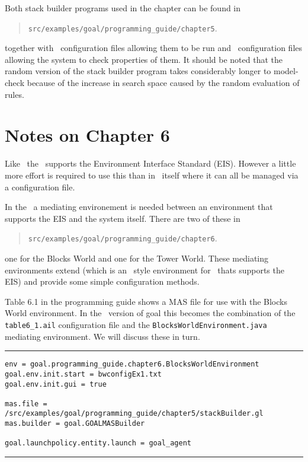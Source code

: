 \documentclass[a4]{article}
\begin{document}
{{{{Both stack builder programs used in the chapter can be found in
\begin{quote}
  \texttt{src/examples/goal/programming\_guide/chapter5}.
\end{quote}
together with \ail\ configuration files allowing them to be run and \ajpf\ configuration files allowing the system to check properties of them.  It should be noted that the random version of the stack builder program takes considerably longer to model-check because of the increase in search space caused by the random evaluation of rules.

\section{Notes on Chapter 6}

Like \goal\ the \ail\ supports the Environment Interface Standard (EIS).  However a little more effort is required to use this than in \goal\ itself where it can all be managed via a configuration file.

In the \ail\ a mediating environement is needed between an environment that supports the EIS and the system itself.  There are two of these in 
\begin{quote}
  \texttt{src/examples/goal/programming\_guide/chapter6}.
\end{quote}
one for the Blocks World and one for the Tower World.  These mediating environments extend  (which is an \ail\ style environment for \goal\ thats supports the EIS) and provide some simple configuration methods.

Table 6.1 in the programming guide shows a MAS file for use with the Blocks World environment.  In the \ail\ version of goal this becomes the combination of the \texttt{table6\_1.ail} configuration file and the \texttt{BlocksWorldEnvironment.java} mediating environment.  We will discuss these in turn.

\noindent\rule{\textwidth}{1pt}
\begin{small}
\begin{verbatim}
env = goal.programming_guide.chapter6.BlocksWorldEnvironment
goal.env.init.start = bwconfigEx1.txt
goal.env.init.gui = true

mas.file = /src/examples/goal/programming_guide/chapter5/stackBuilder.gl
mas.builder = goal.GOALMASBuilder

goal.launchpolicy.entity.launch = goal_agent
\end{verbatim}
\end{small}
\rule{\textwidth}{1pt}

}}}}
\end{document}
